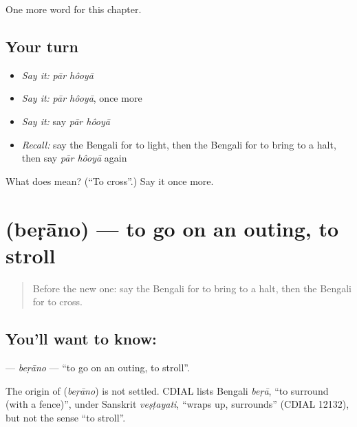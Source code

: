 \begin{grammarlens}[title={What you've built}]
One more word for this chapter.
\end{grammarlens}

\subsection*{Your turn}
\begin{itemize}
\raggedright
  \item \emph{Say it:} \emph{pār hôoyā}
  \item \emph{Say it:} \emph{pār hôoyā}, once more
  \item \emph{Say it:} say \emph{pār hôoyā}
  \item \emph{Recall:} say the Bengali for to light, then the Bengali for to bring to a halt, then say \emph{pār hôoyā} again
\end{itemize}

\begin{tcolorbox}[breakable,colback=teal!4,colframe=teal!35!black,title={Before you move on}]
What does   mean? (\textquotedblleft{}To cross\textquotedblright{}.) Say it once more.
\end{tcolorbox}
\section[\texorpdfstring{\bn{বেড়ানো} (beṛāno)}{বেড়ানো (beṛāno)}]{ (beṛāno) — to go on an outing, to stroll}

\label{lesson:BN-C237-berano}



\begin{quote}
Before the new one: say the Bengali for to bring to a halt, then the Bengali for to cross.
\end{quote}

\subsection*{You'll want to know: }
\textbf{} — \emph{beṛāno} — \textquotedblleft{}to go on an outing, to stroll\textquotedblright{}.

\begin{cousinweb}
The origin of \textbf{} (\emph{beṛāno}) is not settled. CDIAL lists Bengali \emph{beṛā}, \textquotedblleft{}to surround (with a fence)\textquotedblright{}, under Sanskrit \emph{veṣṭayati}, \textquotedblleft{}wraps up, surrounds\textquotedblright{} (CDIAL 12132), but not the sense \textquotedblleft{}to stroll\textquotedblright{}.
\end{cousinweb}

